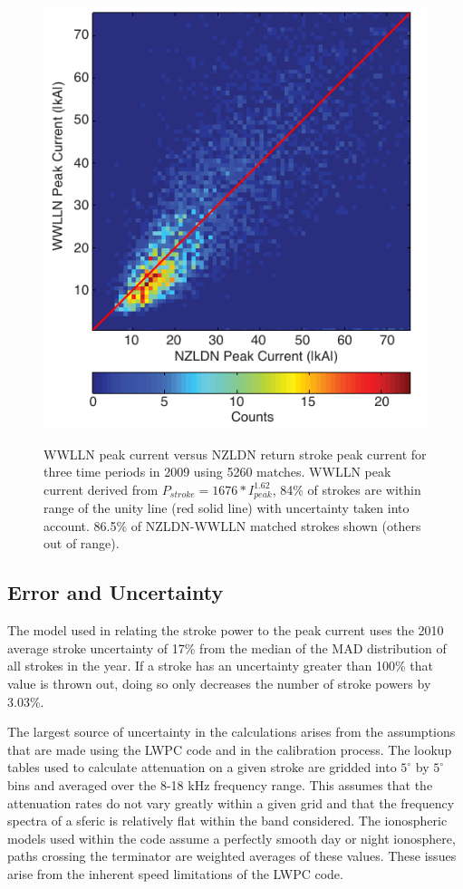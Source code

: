 \begin{figure}[ht!]
\centering
\includegraphics[scale=1]{energy/Figures/PPS_PvI_Error.pdf}\\
\caption{WWLLN peak current versus NZLDN return stroke peak current for three time periods in 2009 using 5260 matches. WWLLN peak current derived from $P_{stroke} = 1676 * I_{peak}^{1.62}$, 84\% of strokes are within range of the unity line (red solid line) with uncertainty taken into account. 86.5\% of NZLDN-WWLLN matched strokes shown (others out of range).}
\label{energy:fig:pvi}
\end{figure}

\subsection{Error and Uncertainty}

The model used in relating the stroke power to the peak current uses the 2010 average stroke uncertainty of 17\% from the median of the MAD distribution of all strokes in the year.
If a stroke has an uncertainty greater than 100\% that value is thrown out, doing so only decreases the number of stroke powers by 3.03\%.

The largest source of uncertainty in the calculations arises from the assumptions that are made using the LWPC code and in the calibration process.
The lookup tables used to calculate attenuation on a given stroke are gridded into $5^{\circ}$ by $5^{\circ}$ bins and averaged over the 8-18 kHz frequency range.
This assumes that the attenuation rates do not vary greatly within a given grid and that the frequency spectra of a sferic is relatively flat within the band considered.
The ionospheric models used within the code assume a perfectly smooth day or night ionosphere, paths crossing the terminator are weighted averages of these values.
These issues arise from the inherent speed limitations of the LWPC code.

